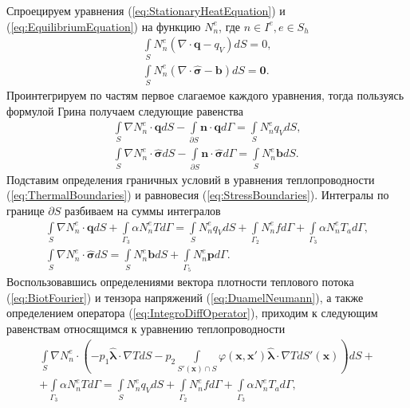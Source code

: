 Спроецируем уравнения (\ref{eq:StationaryHeatEquation}) и (\ref{eq:EquilibriumEquation}) на функцию $N_n^{e}$, где $n \in I^{e}, e \in S_h$
\begin{gather*}
	\int\limits_S N_n^{e} \left( \nabla \cdot \boldsymbol{q} - q_V \right) dS = 0,
	\\
	\int\limits_S N_n^{e} (\nabla \cdot \widehat{\boldsymbol{\sigma}} - \boldsymbol{b}) dS = \boldsymbol{0}.
\end{gather*}
Проинтегрируем по частям первое слагаемое каждого уравнения, тогда пользуясь формулой Грина получаем следующие равенства
\begin{gather*}
	\int\limits_S \nabla N_n^{e} \cdot \boldsymbol{q} dS -
	\int\limits_{\partial S} \boldsymbol{n} \cdot \boldsymbol{q} d\Gamma =
	\int\limits_S N_n^{e} q_V dS, \\
	\int\limits_S \nabla N_n^{e} \cdot \widehat{\boldsymbol{\sigma}} dS -
	\int\limits_{\partial S} \boldsymbol{n} \cdot \widehat{\boldsymbol{\sigma}} d\Gamma =
	\int\limits_S N_n^{e} \boldsymbol{b} dS.
\end{gather*}
Подставим определения граничных условий в уравнения теплопроводности (\ref{eq:ThermalBoundaries}) и равновесия (\ref{eq:StressBoundaries}). Интегралы по границе $\partial S$ разбиваем на суммы интегралов
\begin{gather*}
	\int\limits_S \nabla N_n^{e} \cdot \boldsymbol{q} dS +
	\int\limits_{\Gamma_3} \alpha N_n^{e} T d\Gamma =
	\int\limits_S N_n^{e} q_V dS +
	\int\limits_{\Gamma_2} N_n^{e} f d\Gamma +
	\int\limits_{\Gamma_3} \alpha N_n^{e} T_a d\Gamma, \\
	\int\limits_S \nabla N_n^{e} \cdot \widehat{\boldsymbol{\sigma}} dS =	
	\int\limits_S N_n^{e} \boldsymbol{b} dS +
	\int\limits_{\Gamma_5} N_n^{e} \boldsymbol{p} d\Gamma.
\end{gather*}
Воспользовавшись определениями вектора плотности теплового потока (\ref{eq:BiotFourier}) и тензора напряжений (\ref{eq:DuamelNeumann}), а также определением оператора (\ref{eq:IntegroDiffOperator}), приходим к следующим равенствам относящимся к уравнению теплопроводности
\begin{multline}
	\label{eq:ThermalIntegrate}
	\int\limits_S \nabla N_n^{e} \cdot 
	\left(
		-p_1 \widehat{\boldsymbol{\lambda}} \cdot \nabla T dS
		-
		p_2 	\int\limits_{S'(\boldsymbol{x}) \cap S} 
	\varphi(\boldsymbol{x}, \boldsymbol{x}') \widehat{\boldsymbol{\lambda}} \cdot \nabla T
	dS'(\boldsymbol{x})
	\right) dS 
	+ \\ +
	\int\limits_{\Gamma_3} \alpha N_n^{e} T d\Gamma 
	=
	\int\limits_S N_n^{e} q_V dS +
	\int\limits_{\Gamma_2} N_n^{e} f d\Gamma + 
	\int\limits_{\Gamma_3} \alpha N_n^{e} T_a d\Gamma,
\end{multline}
